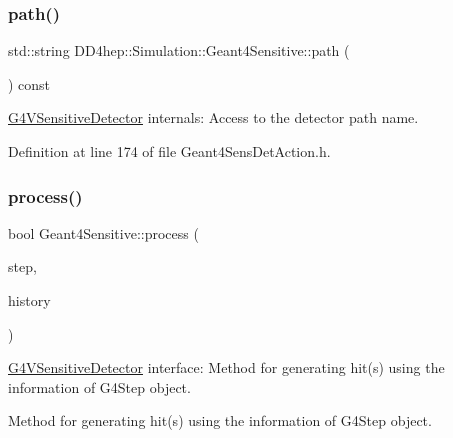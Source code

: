\subsubsection{\texorpdfstring{path()}{path()}}
{\footnotesize\ttfamily std\+::string D\+D4hep\+::\+Simulation\+::\+Geant4\+Sensitive\+::path (\begin{DoxyParamCaption}{ }\end{DoxyParamCaption}) const\hspace{0.3cm}{\ttfamily [inline]}}



\hyperlink{class_g4_v_sensitive_detector}{G4\+V\+Sensitive\+Detector} internals\+: Access to the detector path name. 



Definition at line 174 of file Geant4\+Sens\+Det\+Action.\+h.

\hypertarget{class_d_d4hep_1_1_simulation_1_1_geant4_sensitive_a9a9463a6c29a66dad43a52ffc9f7838d}{}\label{class_d_d4hep_1_1_simulation_1_1_geant4_sensitive_a9a9463a6c29a66dad43a52ffc9f7838d} 
\subsubsection{\texorpdfstring{process()}{process()}}
{\footnotesize\ttfamily bool Geant4\+Sensitive\+::process (\begin{DoxyParamCaption}\item[{G4\+Step $\ast$}]{step,  }\item[{G4\+Touchable\+History $\ast$}]{history }\end{DoxyParamCaption})\hspace{0.3cm}{\ttfamily [virtual]}}



\hyperlink{class_g4_v_sensitive_detector}{G4\+V\+Sensitive\+Detector} interface\+: Method for generating hit(s) using the information of G4\+Step object. 

Method for generating hit(s) using the information of G4\+Step object. 


